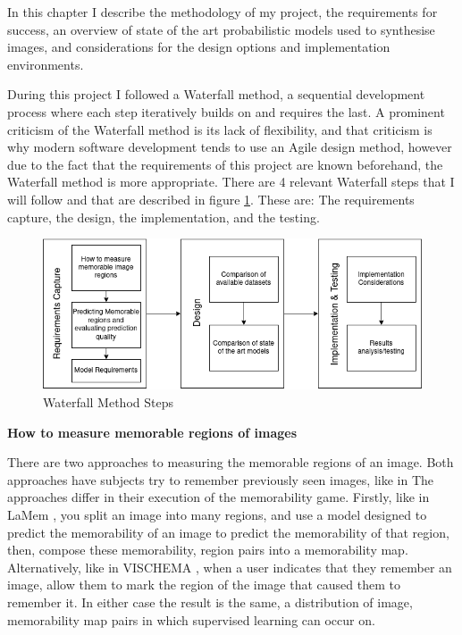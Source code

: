 \documentclass{UoYCSproject}
\begin{document}
In this chapter I describe the methodology of my project, the requirements for success, an overview of state of the art probabilistic models used to synthesise images, and considerations for the design options and implementation environments. 

During this project I followed a Waterfall method, a sequential development process where each step iteratively builds on and requires the last. A prominent criticism of the Waterfall method is its lack of flexibility, and that criticism is why modern software development tends to use an Agile design method, however due to the fact that the requirements of this project are known beforehand, the Waterfall method is more appropriate. There are 4 relevant Waterfall steps that I will follow and that are described in figure \ref{fig:waterfall method}. These are: The requirements capture, the design, the implementation, and the testing.

\begin{figure}[ht]
    \centering
    \includegraphics[width=\linewidth]{Waterfall Model} %
    \caption{Waterfall Method Steps}
    \label{fig:waterfall method}
\end{figure}

\textbf{How to measure memorable regions of images}

There are two approaches to measuring the memorable regions of an image. Both approaches have subjects try to remember previously seen images, like in
The approaches differ in their execution of the memorability game. Firstly, like in LaMem \cite{ICCV15_Khosla}, you split an image into many regions, and use a model designed to predict the memorability of an image to predict the memorability of that region, then, compose these memorability, region pairs into a memorability map. 
Alternatively, like in VISCHEMA \cite{VischemaPaper}, when a user indicates that they remember an image, allow them to mark the region of the image that caused them to remember it. 
In either case the result is the same, a distribution of image, memorability map pairs in which supervised learning can occur on.
\end{document}
